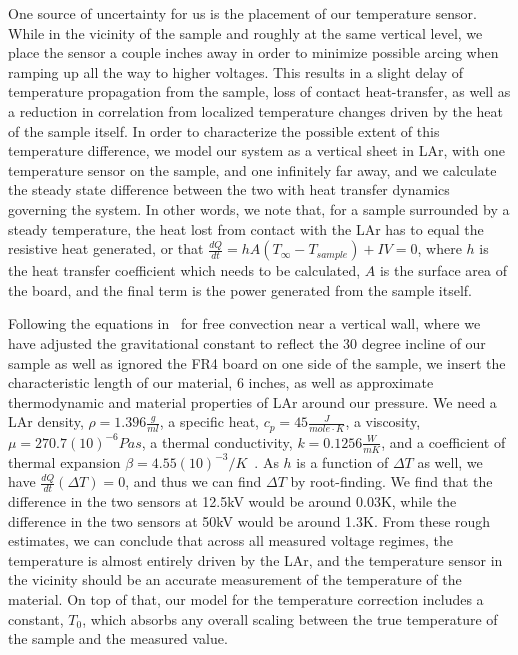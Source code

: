 \documentclass[a4paper,12pt]{article}
\begin{document}
One source of uncertainty for us is the placement of our temperature sensor. While in the vicinity of the sample and roughly at the same vertical level, we place the sensor a couple inches away in order to minimize possible arcing when ramping up all the way to higher voltages. This results in a slight delay of temperature propagation from the sample, loss of contact heat-transfer, as well as a reduction in correlation from localized temperature changes driven by the heat of the sample itself. In order to characterize the possible extent of this temperature difference, we model our system as a vertical sheet in LAr, with one temperature sensor on the sample, and one infinitely far away, and we calculate the steady state difference between the two with heat transfer dynamics governing the system. In other words, we note that, for a sample surrounded by a steady temperature, the heat lost from contact with the LAr has to equal the resistive heat generated, or that $\frac{dQ}{dt}=hA(T_{\infty}-T_{sample})+IV=0$, where $h$ is the heat transfer coefficient which needs to be calculated, $A$ is the surface area of the board, and the final term is the power generated from the sample itself.

Following the equations in~\cite{CHURCHILL19751323} for free convection near a vertical wall, where we have adjusted the gravitational constant to reflect the 30 degree incline of our sample as well as ignored the FR4 board on one side of the sample, we insert the characteristic length of our material, 6 inches, as well as approximate thermodynamic and material properties of LAr around our pressure. We need a LAr density, $\rho=1.396\frac{g}{ml}$, a specific heat, $c_p=45\frac{J}{mole \cdot K}$, a viscosity, $\mu=270.7(10)^{-6}Pa s$, a thermal conductivity, $k=0.1256\frac{W}{m K}$, and a coefficient of thermal expansion $\beta=4.55(10)^{ -3}/K$~\cite{GLADUN1971205}\cite{STREETT197459}\cite{lbnl}. As $h$ is a function of $\Delta T$ as well, we have $\frac{dQ}{dt}(\Delta T)=0$, and thus we can find $\Delta T$ by root-finding. We find that the difference in the two sensors at 12.5kV would be around 0.03K, while the difference in the two sensors at 50kV would be around 1.3K. From these rough estimates, we can conclude that across all measured voltage regimes, the temperature is almost entirely driven by the LAr, and the temperature sensor in the vicinity should be an accurate measurement of the temperature of the material. On top of that, our model for the temperature correction includes a constant, $T_0$, which absorbs any overall scaling between the true temperature of the sample and the measured value.
\end{document}
